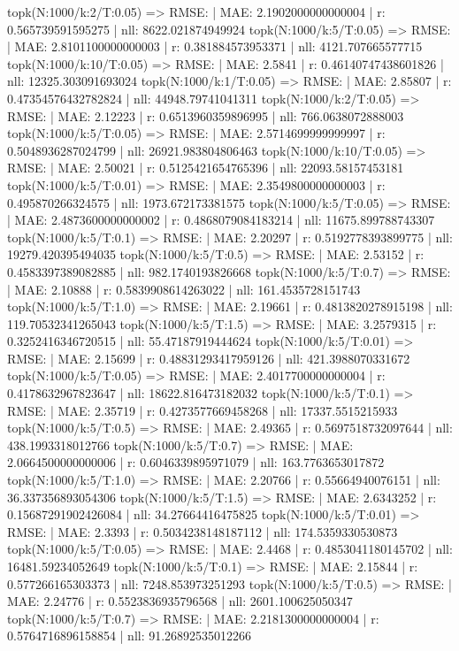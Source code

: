 topk(N:1000/k:2/T:0.05) => RMSE: | MAE: 2.1902000000000004 | r: 0.565739591595275 | nll: 8622.021874949924
topk(N:1000/k:5/T:0.05) => RMSE: | MAE: 2.8101100000000003 | r: 0.381884573953371 | nll: 4121.707665577715
topk(N:1000/k:10/T:0.05) => RMSE: | MAE: 2.5841 | r: 0.46140747438601826 | nll: 12325.303091693024
topk(N:1000/k:1/T:0.05) => RMSE: | MAE: 2.85807 | r: 0.47354576432782824 | nll: 44948.79741041311
topk(N:1000/k:2/T:0.05) => RMSE: | MAE: 2.12223 | r: 0.6513960359896995 | nll: 766.0638072888003
topk(N:1000/k:5/T:0.05) => RMSE: | MAE: 2.5714699999999997 | r: 0.5048936287024799 | nll: 26921.983804806463
topk(N:1000/k:10/T:0.05) => RMSE: | MAE: 2.50021 | r: 0.5125421654765396 | nll: 22093.58157453181
topk(N:1000/k:5/T:0.01) => RMSE: | MAE: 2.3549800000000003 | r: 0.495870266324575 | nll: 1973.672173381575
topk(N:1000/k:5/T:0.05) => RMSE: | MAE: 2.4873600000000002 | r: 0.4868079084183214 | nll: 11675.899788743307
topk(N:1000/k:5/T:0.1) => RMSE: | MAE: 2.20297 | r: 0.5192778393899775 | nll: 19279.420395494035
topk(N:1000/k:5/T:0.5) => RMSE: | MAE: 2.53152 | r: 0.4583397389082885 | nll: 982.1740193826668
topk(N:1000/k:5/T:0.7) => RMSE: | MAE: 2.10888 | r: 0.5839908614263022 | nll: 161.4535728151743
topk(N:1000/k:5/T:1.0) => RMSE: | MAE: 2.19661 | r: 0.4813820278915198 | nll: 119.70532341265043
topk(N:1000/k:5/T:1.5) => RMSE: | MAE: 3.2579315 | r: 0.3252416346720515 | nll: 55.47187919444624
topk(N:1000/k:5/T:0.01) => RMSE: | MAE: 2.15699 | r: 0.48831293417959126 | nll: 421.3988070331672
topk(N:1000/k:5/T:0.05) => RMSE: | MAE: 2.4017700000000004 | r: 0.4178632967823647 | nll: 18622.816473182032
topk(N:1000/k:5/T:0.1) => RMSE: | MAE: 2.35719 | r: 0.4273577669458268 | nll: 17337.5515215933
topk(N:1000/k:5/T:0.5) => RMSE: | MAE: 2.49365 | r: 0.5697518732097644 | nll: 438.1993318012766
topk(N:1000/k:5/T:0.7) => RMSE: | MAE: 2.0664500000000006 | r: 0.6046339895971079 | nll: 163.7763653017872
topk(N:1000/k:5/T:1.0) => RMSE: | MAE: 2.20766 | r: 0.55664940076151 | nll: 36.337356893054306
topk(N:1000/k:5/T:1.5) => RMSE: | MAE: 2.6343252 | r: 0.15687291902426084 | nll: 34.27664416475825
topk(N:1000/k:5/T:0.01) => RMSE: | MAE: 2.3393 | r: 0.5034238148187112 | nll: 174.5359330530873
topk(N:1000/k:5/T:0.05) => RMSE: | MAE: 2.4468 | r: 0.4853041180145702 | nll: 16481.59234052649
topk(N:1000/k:5/T:0.1) => RMSE: | MAE: 2.15844 | r: 0.577266165303373 | nll: 7248.853973251293
topk(N:1000/k:5/T:0.5) => RMSE: | MAE: 2.24776 | r: 0.5523836935796568 | nll: 2601.100625050347
topk(N:1000/k:5/T:0.7) => RMSE: | MAE: 2.2181300000000004 | r: 0.5764716896158854 | nll: 91.26892535012266
